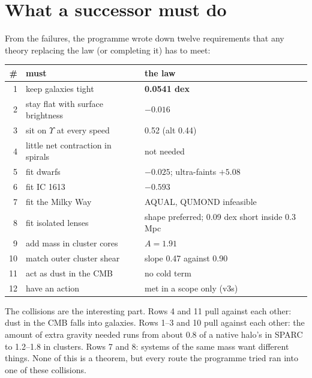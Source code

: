 \section{What a successor must do}

From the failures, the programme wrote down twelve requirements that any theory replacing the law (or completing it) has to meet:

\begin{center}\small
\begin{tabular}{@{}rp{3.1cm}p{4.0cm}@{}}
\toprule
\# & must & the law\\
\midrule
1 & keep galaxies tight & \textbf{0.0541 dex}\\
2 & stay flat with surface brightness & \textbf{$-0.016$}\\
3 & sit on $\Upsilon$ at every speed & 0.52 (alt 0.44)\\
4 & little net contraction in spirals & not needed\\
5 & fit dwarfs & \textbf{$-0.025$}; ultra-faints $+5.08$\\
6 & fit IC 1613 & $-0.593$\\
7 & fit the Milky Way & AQUAL, QUMOND infeasible\\
8 & fit isolated lenses & shape preferred; 0.09 dex short inside 0.3 Mpc\\
9 & add mass in cluster cores & $A=1.91$\\
10 & match outer cluster shear & slope 0.47 against 0.90\\
11 & act as dust in the CMB & no cold term\\
12 & have an action & met in a scope only (v3s)\\
\bottomrule
\end{tabular}
\end{center}

The collisions are the interesting part. Rows 4 and 11 pull against each other: dust in the CMB falls into galaxies. Rows 1--3 and 10 pull against each other: the amount of extra gravity needed runs from about 0.8 of a native halo's in SPARC to 1.2--1.8 in clusters. Rows 7 and 8: systems of the same mass want different things. None of this is a theorem, but every route the programme tried ran into one of these collisions.




